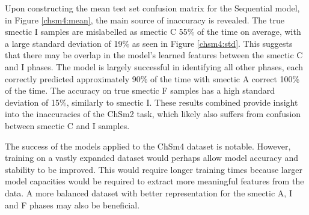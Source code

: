 \documentclass[12pt]{article}
\begin{document}
Upon constructing the mean test set confusion matrix for the Sequential model, in Figure \ref{chsm4:mean}, the main source of inaccuracy is revealed. The true smectic I samples are mislabelled as smectic C 55\% of the time on average, with a large standard deviation of 19\% as seen in Figure \ref{chsm4:std}. This suggests that there may be overlap in the model's learned features between the smectic C and I phases. The model is largely successful in identifying all other phases, each correctly predicted approximately 90\% of the time with smectic A correct 100\% of the time. The accuracy on true smectic F samples has a high standard deviation of 15\%, similarly to smectic I. These results combined provide insight into the inaccuracies of the ChSm2 task, which likely also suffers from confusion between smectic C and I samples.

The success of the models applied to the ChSm4 dataset is notable. However, training on a vastly expanded dataset would perhaps allow model accuracy and stability to be improved. This would require longer training times because larger model capacities would be required to extract more meaningful features from the data. A more balanced dataset with better representation for the smectic A, I and F phases may also be beneficial.
\end{document}
